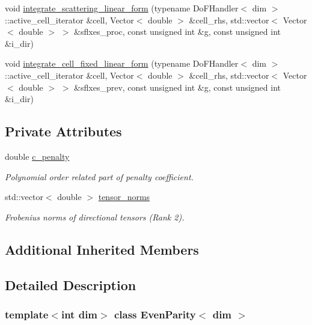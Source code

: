 \begin{DoxyCompactItemize}
\item 
void \hyperlink{class_even_parity_ad29fd3a026508233ef772ea11f27402e}{integrate\+\_\+scattering\+\_\+linear\+\_\+form} (typename Do\+F\+Handler$<$ dim $>$\+::active\+\_\+cell\+\_\+iterator \&cell, Vector$<$ double $>$ \&cell\+\_\+rhs, std\+::vector$<$ Vector$<$ double $>$ $>$ \&sflxes\+\_\+proc, const unsigned int \&g, const unsigned int \&i\+\_\+dir)
\item 
void \hyperlink{class_even_parity_adc8fad33adf1fae4fb59268b365b21f9}{integrate\+\_\+cell\+\_\+fixed\+\_\+linear\+\_\+form} (typename Do\+F\+Handler$<$ dim $>$\+::active\+\_\+cell\+\_\+iterator \&cell, Vector$<$ double $>$ \&cell\+\_\+rhs, std\+::vector$<$ Vector$<$ double $>$ $>$ \&sflxes\+\_\+prev, const unsigned int \&g, const unsigned int \&i\+\_\+dir)
\end{DoxyCompactItemize}
\subsection*{Private Attributes}
\begin{DoxyCompactItemize}
\item 
double \hyperlink{class_even_parity_a0eeae2ea4837040ebd8df4a997d82acd}{c\+\_\+penalty}
\begin{DoxyCompactList}\small\item\em Polynomial order related part of penalty coefficient. \end{DoxyCompactList}\item 
std\+::vector$<$ double $>$ \hyperlink{class_even_parity_aca63481c4a5de27e6acc2fc72d802303}{tensor\+\_\+norms}
\begin{DoxyCompactList}\small\item\em Frobenius norms of directional tensors (Rank 2). \end{DoxyCompactList}\end{DoxyCompactItemize}
\subsection*{Additional Inherited Members}


\subsection{Detailed Description}
\subsubsection*{template$<$int dim$>$\newline
class Even\+Parity$<$ dim $>$}

